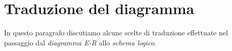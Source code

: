 \section{Traduzione del diagramma}
In questo paragrafo discutiamo alcune scelte di traduzione effettuate nel passaggio
dal {\it diagramma E-R} allo {\it schema logico}.

